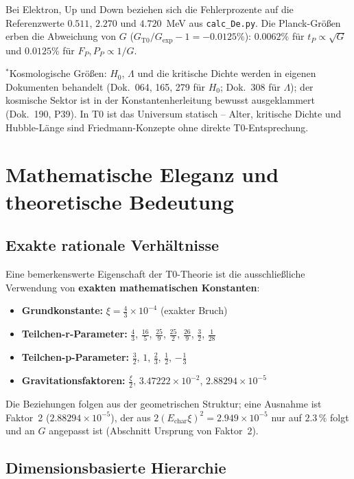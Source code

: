 	Bei Elektron, Up und Down beziehen sich die Fehlerprozente auf die Referenzwerte $0.511$, $2.270$ und $4.720$~MeV aus \texttt{calc\_De.py}. Die Planck-Größen erben die Abweichung von $G$ ($G_{\text{T0}}/G_{\text{exp}} - 1 = -0.0125\%$): $0.0062\%$ für $t_P \propto \sqrt{G}$ und $0.0125\%$ für $F_P, P_P \propto 1/G$.
	
	{\small $^*$Kosmologische Größen: $H_0$, $\Lambda$ und die kritische Dichte werden in eigenen Dokumenten behandelt (Dok.~064, 165, 279 für $H_0$; Dok.~308 für $\Lambda$); der kosmische Sektor ist in der Konstantenherleitung bewusst ausgeklammert (Dok.~190, P39). In T0 ist das Universum statisch -- Alter, kritische Dichte und Hubble-Länge sind Friedmann-Konzepte ohne direkte T0-Entsprechung.}
	
	\section{Mathematische Eleganz und theoretische Bedeutung}
	
	\subsection{Exakte rationale Verhältnisse}
	
	Eine bemerkenswerte Eigenschaft der T0-Theorie ist die ausschließliche Verwendung von \textbf{exakten mathematischen Konstanten}:
	
	\begin{itemize}
		\item \textbf{Grundkonstante:} $\xi = \frac{4}{3} \times 10^{-4}$ (exakter Bruch)
		\item \textbf{Teilchen-r-Parameter:} $\frac{4}{3}$, $\frac{16}{5}$, $\frac{25}{9}$, $\frac{25}{2}$, $\frac{26}{9}$, $\frac{3}{2}$, $\frac{1}{28}$
		\item \textbf{Teilchen-p-Parameter:} $\frac{3}{2}$, $1$, $\frac{2}{3}$, $\frac{1}{2}$, $-\frac{1}{3}$
		\item \textbf{Gravitationsfaktoren:} $\frac{\xi}{2}$, $3.47222 \times 10^{-2}$, $2.88294 \times 10^{-5}$
	\end{itemize}
	
	Die Beziehungen folgen aus der geometrischen Struktur; eine Ausnahme ist Faktor~2 ($2.88294\times10^{-5}$), der aus $2(E_{\text{char}}\xi)^2 = 2.949\times10^{-5}$ nur auf $2.3\,\%$ folgt und an $G$ angepasst ist (Abschnitt Ursprung von Faktor~2).
	
	\subsection{Dimensionsbasierte Hierarchie}
	
